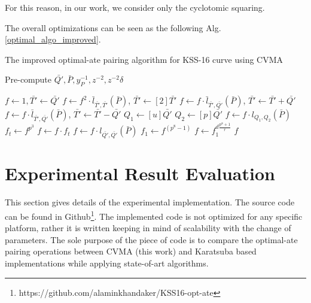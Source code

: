 For this reason, in our work, we consider only the cyclotomic squaring.

The overall optimizations can be seen as the following Alg. \ref{optimal_algo_improved}.

\begin{algorithm}[!h]
	\caption{The improved optimal-ate pairing algorithm for KSS-16 curve using CVMA}
	\label{optimal_algo_improved}
	\DontPrintSemicolon
	\hspace{-3ex}
	\hspace{-3ex}

	\nl Pre-compute $\bar{Q'},\bar{P},y_{P}^{-1}, z^{-2}, z^{-2}\delta$ 
	
	\nl $f \leftarrow 1, \bar{T'} \leftarrow \bar{Q'}$\;
	\nl {} {
		\nl $f\leftarrow f^2\cdot \bar{l}_{\bar{T'},\bar{T'}}(\bar{P}) $, $ \bar{T'} \leftarrow [2] \bar{T'} $ 
		\nl {} {
			\nl $f\leftarrow f\cdot \bar{l}_{\bar{T'},\bar{Q'}}(\bar{P})$, $ \bar{T'} \leftarrow  \bar{T'} + \bar{Q'} $ }
		\nl {} {
			\nl $f\leftarrow f\cdot \bar{l}_{\bar{T'},\bar{Q'}}(\bar{P})$, $ \bar{T'} \leftarrow  \bar{T'} - \bar{Q'} $}} 
	\nl $Q_1\leftarrow [u]\bar{Q'}$  
	\nl $Q_2\leftarrow [p]\bar{Q'}$ 
	\nl $f\leftarrow f\cdot l_{Q_1,Q_2}(\bar{P})$ 
	\nl $f_t\leftarrow f^{p^3}$   
	\nl $f\leftarrow f\cdot f_t$ 
	\nl $f\leftarrow f\cdot l_{\bar{Q'},\bar{Q'}}(\bar{P})$ 
	\nl $f_1\leftarrow f^{(p^{8}-1)}$  
	\nl $f\leftarrow f_1^{d\frac{p^{8}+1}{r}}$  
	 $f$\;
\end{algorithm}


\section{Experimental Result Evaluation}\label{sec:4}
This section gives details of the experimental implementation. 
The source code can be found in Github\footnote{\label{source}https://github.com/alaminkhandaker/KSS16-opt-ate}. 
The implemented code is not optimized for any specific platform, rather it is written keeping in mind of scalability with the change of parameters.
The sole purpose of the piece of code is to compare the optimal-ate pairing operations between CVMA (this work) and Karatsuba based implementations \cite{INDOCRYPT:KNGDNK17} while applying state-of-art algorithms.

